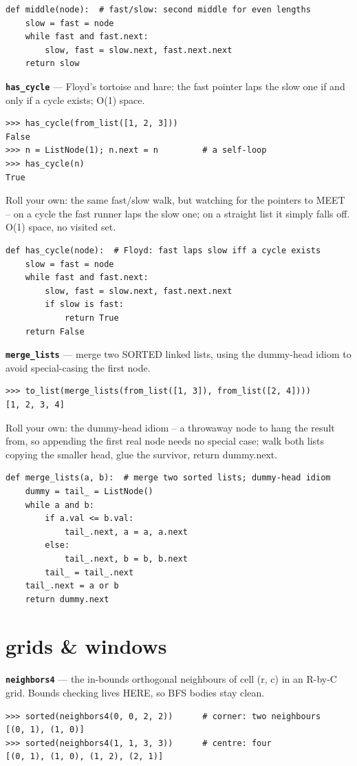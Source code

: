 \documentclass[10pt,letterpaper]{article}
\begin{document}
\begin{lstlisting}[style=ex]
def middle(node):  # fast/slow: second middle for even lengths
    slow = fast = node
    while fast and fast.next:
        slow, fast = slow.next, fast.next.next
    return slow
\end{lstlisting}
\textbf{\texttt{has\_cycle}} --- Floyd's tortoise and hare: the fast pointer laps the slow one if and only if a cycle exists; O(1) space.
\begin{lstlisting}[style=ex]
>>> has_cycle(from_list([1, 2, 3]))
False
>>> n = ListNode(1); n.next = n         # a self-loop
>>> has_cycle(n)
True
\end{lstlisting}

Roll your own: the same fast/slow walk, but watching for the pointers to MEET -- on a cycle the fast runner laps the slow one; on a straight list it simply falls off. O(1) space, no visited set.

\begin{lstlisting}[style=ex]
def has_cycle(node):  # Floyd: fast laps slow iff a cycle exists
    slow = fast = node
    while fast and fast.next:
        slow, fast = slow.next, fast.next.next
        if slow is fast:
            return True
    return False
\end{lstlisting}
\textbf{\texttt{merge\_lists}} --- merge two SORTED linked lists, using the dummy-head idiom to avoid special-casing the first node.
\begin{lstlisting}[style=ex]
>>> to_list(merge_lists(from_list([1, 3]), from_list([2, 4])))
[1, 2, 3, 4]
\end{lstlisting}

Roll your own: the dummy-head idiom -- a throwaway node to hang the result from, so appending the first real node needs no special case; walk both lists copying the smaller head, glue the survivor, return dummy.next.

\begin{lstlisting}[style=ex]
def merge_lists(a, b):  # merge two sorted lists; dummy-head idiom
    dummy = tail_ = ListNode()
    while a and b:
        if a.val <= b.val:
            tail_.next, a = a, a.next
        else:
            tail_.next, b = b, b.next
        tail_ = tail_.next
    tail_.next = a or b
    return dummy.next
\end{lstlisting}

\section{grids \& windows}
\textbf{\texttt{neighbors4}} --- the in-bounds orthogonal neighbours of cell (r, c) in an R-by-C grid. Bounds checking lives HERE, so BFS bodies stay clean.
\begin{lstlisting}[style=ex]
>>> sorted(neighbors4(0, 0, 2, 2))      # corner: two neighbours
[(0, 1), (1, 0)]
>>> sorted(neighbors4(1, 1, 3, 3))      # centre: four
[(0, 1), (1, 0), (1, 2), (2, 1)]
\end{lstlisting}
\end{document}
